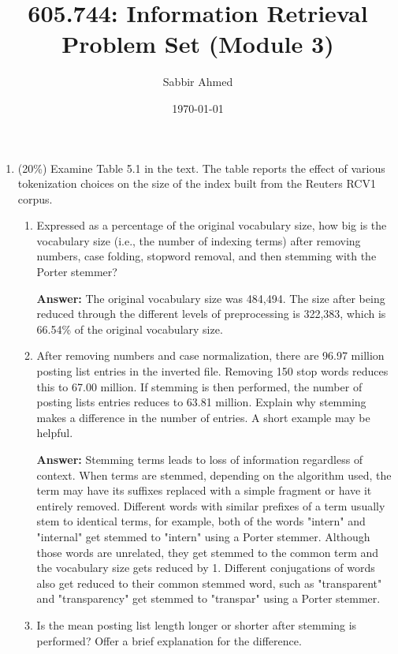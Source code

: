 \documentclass[11pt]{article}
\title{605.744: Information Retrieval \\ Problem Set (Module 3)}
\author{Sabbir Ahmed}
\date{\today}
\begin{document}
\maketitle

    \begin{enumerate}

        \item (20\%) Examine Table 5.1 in the text. The table reports the effect of various tokenization choices on the size of the index built from the Reuters RCV1 corpus.

        \begin{enumerate}
            \item Expressed as a percentage of the original vocabulary size, how big is the vocabulary size (i.e., the number of indexing terms) after removing numbers, case folding, stopword removal, and then stemming with the Porter stemmer?

            \textbf{Answer:} The original vocabulary size was 484,494. The size after being reduced through the different levels of preprocessing is 322,383, which is 66.54\% of the original vocabulary size.

            \item After removing numbers and case normalization, there are 96.97 million posting list entries in the inverted file. Removing 150 stop words reduces this to 67.00 million. If stemming is then performed, the number of posting lists entries reduces to 63.81 million. Explain why stemming makes a difference in the number of entries. A short example may be helpful.

            \textbf{Answer:} Stemming terms leads to loss of information regardless of context. When terms are stemmed, depending on the algorithm used, the term may have its suffixes replaced with a simple fragment or have it entirely removed. Different words with similar prefixes of a term usually stem to identical terms, for example, both of the words "intern" and "internal" get stemmed to "intern" using a Porter stemmer. Although those words are unrelated, they get stemmed to the common term and the vocabulary size gets reduced by 1. Different conjugations of words also get reduced to their common stemmed word, such as "transparent" and "transparency" get stemmed to "transpar" using a Porter stemmer.

            \item Is the mean posting list length longer or shorter after stemming is performed? Offer a brief explanation for the difference.


\end{enumerate}
\end{enumerate}
\end{document}
